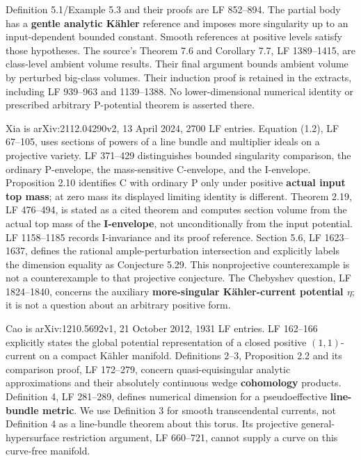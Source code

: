 \documentclass[11pt]{article}
\begin{document}
Definition 5.1/\allowbreak{}Example 5.3 and their proofs are LF 852–894. The partial body has a \textbf{gentle analytic Kähler} reference and imposes more singularity up to an input-\allowbreak{}dependent bounded constant. Smooth references at positive levels satisfy those hypotheses. The source's Theorem 7.6 and Corollary 7.7, LF 1389–1415, are class-\allowbreak{}level ambient volume results. Their final argument bounds ambient volume by perturbed big-\allowbreak{}class volumes. Their induction proof is retained in the extracts, including LF 939–963 and 1139–1388. No lower-\allowbreak{}dimensional numerical identity or prescribed arbitrary P-\allowbreak{}potential theorem is asserted there.

Xia is arXiv:2112.04290v2, 13 April 2024, 2700 LF entries. Equation (1.2), LF 67–105, uses sections of powers of a line bundle and multiplier ideals on a projective variety. LF 371–429 distinguishes bounded singularity comparison, the ordinary P-\allowbreak{}envelope, the mass-\allowbreak{}sensitive C-\allowbreak{}envelope, and the I-\allowbreak{}envelope. Proposition 2.10 identifies C with ordinary P only under positive \textbf{actual input top mass}; at zero mass its displayed limiting identity is different. Theorem 2.19, LF 476–494, is stated as a cited theorem and computes section volume from the actual top mass of the \textbf{I-\allowbreak{}envelope}, not unconditionally from the input potential. LF 1158–1185 records I-\allowbreak{}invariance and its proof reference. Section 5.6, LF 1623–1637, defines the rational ample-\allowbreak{}perturbation intersection and explicitly labels the dimension equality as Conjecture 5.29. This nonprojective counterexample is not a counterexample to that projective conjecture. The Chebyshev question, LF 1824–1840, concerns the auxiliary \textbf{more-\allowbreak{}singular Kähler-\allowbreak{}current potential $\eta$}; it is not a question about an arbitrary positive form.

Cao is arXiv:1210.5692v1, 21 October 2012, 1931 LF entries. LF 162–166 explicitly states the global potential representation of a closed positive $(1,1)$-\allowbreak{}current on a compact Kähler manifold. Definitions 2–3, Proposition 2.2 and its comparison proof, LF 172–279, concern quasi-\allowbreak{}equisingular analytic approximations and their absolutely continuous wedge \textbf{cohomology} products. Definition 4, LF 281–289, defines numerical dimension for a pseudoeffective \textbf{line-\allowbreak{}bundle metric}. We use Definition 3 for smooth transcendental currents, not Definition 4 as a line-\allowbreak{}bundle theorem about this torus. Its projective general-\allowbreak{}hypersurface restriction argument, LF 660–721, cannot supply a curve on this curve-\allowbreak{}free manifold.
\end{document}
